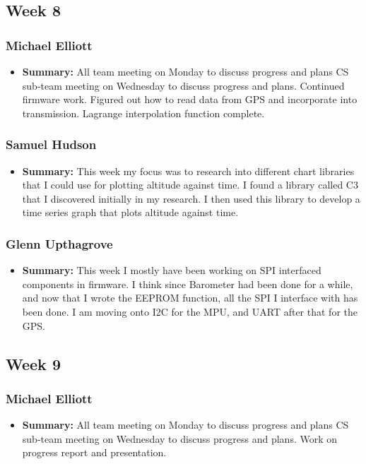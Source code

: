 \documentclass[onecolumn, draftclsnofoot,10pt, compsoc]{IEEEtran}
\begin{document}
\subsection{Week 8}
\subsubsection{Michael Elliott}
\begin{itemize}
 \item \textbf{Summary: } All team meeting on Monday to discuss progress and plans
CS sub-team meeting on Wednesday to discuss progress and plans.
Continued firmware work.
Figured out how to read data from GPS and incorporate into transmission.
Lagrange interpolation function complete.
\end{itemize}
\subsubsection{Samuel Hudson}
\begin{itemize}
 \item \textbf{Summary: } This week my focus was to research into different chart libraries that I could use for plotting altitude against time. I found a library called C3 that I discovered initially in my research. I then used this library to develop a time series graph that plots altitude against time.
\end{itemize}
\subsubsection{Glenn Upthagrove}
\begin{itemize}
 \item \textbf{Summary: }This week I mostly have been working on SPI interfaced components in firmware. I think since Barometer had been done for a while, and now that I wrote the EEPROM function, all the SPI I interface with has been done. I am moving onto I2C for the MPU, and UART after that for the GPS.  
\end{itemize}
\subsection{Week 9}
\subsubsection{Michael Elliott}
\begin{itemize}
 \item \textbf{Summary: } All team meeting on Monday to discuss progress and plans
CS sub-team meeting on Wednesday to discuss progress and plans.
Work on progress report and presentation.
\end{itemize}
\end{document}
